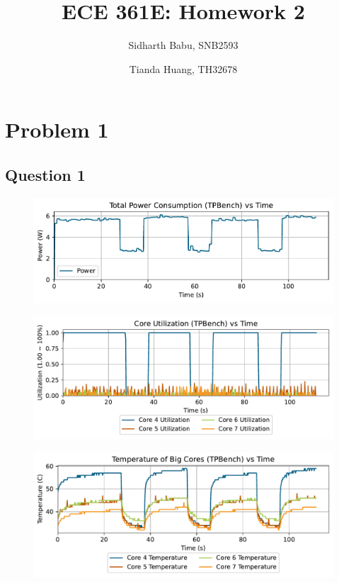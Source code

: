 \documentclass{article}
\author{Sidharth Babu, SNB2593 \and Tianda Huang, TH32678}
\title{ECE 361E: Homework 2}
\begin{document}
\begin{mdframed}
    \maketitle
\end{mdframed}
\pagebreak

\section{Problem 1}

\subsection{Question 1}
\begin{figure} [!htb]
    \centering
    \includegraphics[scale=0.8]{tpb_power.pdf}
    \label{fig:tpb-power}
\end{figure}
\begin{figure} [!htb]
    \centering
    \includegraphics[scale=0.8]{tpb_util.pdf}
    \label{fig:tpb-util}
\end{figure}
\begin{figure} [!htb]
    \centering
    \includegraphics[scale=0.8]{tpb_temp.pdf}
    \label{fig:tpb-temp}
\end{figure}
\end{document}
